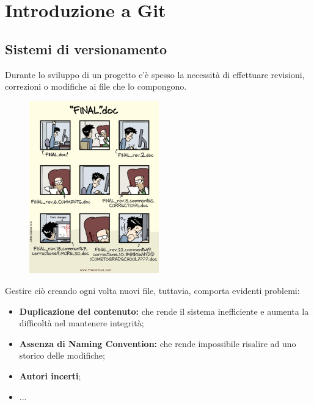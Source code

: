 \documentclass[12pt]{article}
\begin{document}
    \newpage
    \section{Introduzione a Git}
    \subsection{Sistemi di versionamento}
    Durante lo sviluppo di un progetto c'è spesso la necessità di effettuare revisioni, correzioni o modifiche ai file che lo compongono.
    \begin{figure}[H]
        \centering
        \includegraphics[width=0.5\textwidth]{introduzione_a_git/no_git_example.png}
    \end{figure}
    Gestire ciò creando ogni volta nuovi file, tuttavia, comporta evidenti problemi:
    \begin{itemize}
      \item \textbf{Duplicazione del contenuto:} che rende il sistema inefficiente e aumenta la difficoltà nel mantenere integrità;
      \item \textbf{Assenza di Naming Convention:} che rende impossibile risalire ad uno storico delle modifiche;
      \item \textbf{Autori incerti};
      \item ...
    \end{itemize}
\end{document}

